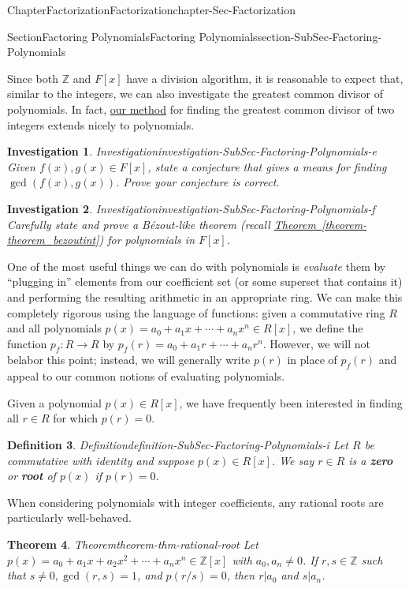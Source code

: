 \documentclass[oneside,10pt,]{book}
\newcommand{\xreffont}{\relax}
\newcommand{\terminology}[1]{\textbf{#1}}
\numberwithin{equation}{section}
\def\Z{{\mathbb Z}}
\newtheorem{theorem}{Theorem}[section]
\newtheorem{definition}[theorem]{Definition}
\newtheorem{investigation}[theorem]{Investigation}
\begin{document}
\begin{chapterptx}{Chapter}{Factorization}{}{Factorization}{}{}{chapter-Sec-Factorization}
\begin{sectionptx}{Section}{Factoring Polynomials}{}{Factoring Polynomials}{}{}{section-SubSec-Factoring-Polynomials}
\par
Since both \(\Z\) and \(F[x]\) have a division algorithm, it is reasonable to expect that, similar to the integers, we can also investigate the greatest common divisor of polynomials. In fact, \hyperref[investigation-invest-euclid-alg-integers]{our method} for finding the greatest common divisor of two integers extends nicely to polynomials.%
\begin{investigation}{Investigation}{}{investigation-SubSec-Factoring-Polynomials-e}%
Given \(f(x),g(x)\in F[x]\), state a conjecture that gives a means for finding \(\gcd(f(x),g(x))\). Prove your conjecture is correct.%
\end{investigation}%
\begin{investigation}{Investigation}{}{investigation-SubSec-Factoring-Polynomials-f}%
Carefully state and prove a Bézout-like theorem (recall \hyperref[theorem-theorem_bezoutint]{Theorem~{\xreffont\ref{theorem-theorem_bezoutint}}}) for polynomials in \(F[x]\).%
\end{investigation}%
One of the most useful things we can do with polynomials is \emph{evaluate} them by ``plugging in'' elements from our coefficient set (or some superset that contains it) and performing the resulting arithmetic in an appropriate ring. We can make this completely rigorous using the language of functions: given a commutative ring \(R\) and all polynomials \(p(x) = a_0 + a_1 x + \cdots + a_n x^n \in R[x]\), we define the function \(p_f : R\to R\) by \(p_f(r) = a_0 + a_1 r + \cdots + a_n r^n \). However, we will not belabor this point; instead, we will generally write \(p(r)\) in place of \(p_f(r)\) and appeal to our common notions of evaluating polynomials.%
\par
Given a polynomial \(p(x)\in R[x]\), we have frequently been interested in finding all \(r\in R\) for which \(p(r) = 0\).%
\begin{definition}{Definition}{}{definition-SubSec-Factoring-Polynomials-i}%
%
%
Let \(R\) be commutative with identity and suppose \(p(x) \in R[x]\). We say \(r\in R\) is a \terminology{zero} or \terminology{root} of \(p(x)\) if \(p(r) = 0\).%
\end{definition}
When considering polynomials with integer coefficients, any rational roots are particularly well-behaved.%
\begin{theorem}{Theorem}{}{}{theorem-thm-rational-root}%
Let \(p(x) = a_0 + a_1 x + a_2 x^2 + \cdots + a_n x^n \in \Z[x]\) with \(a_0,a_n\ne 0\). If \(r,s\in\Z\) such that \(s\ne 0, \gcd(r,s)=1\), and \(p(r/s)=0\), then \(r|a_0\) and \(s|a_n\).%

\end{theorem}
\end{sectionptx}
\end{chapterptx}
\end{document}
